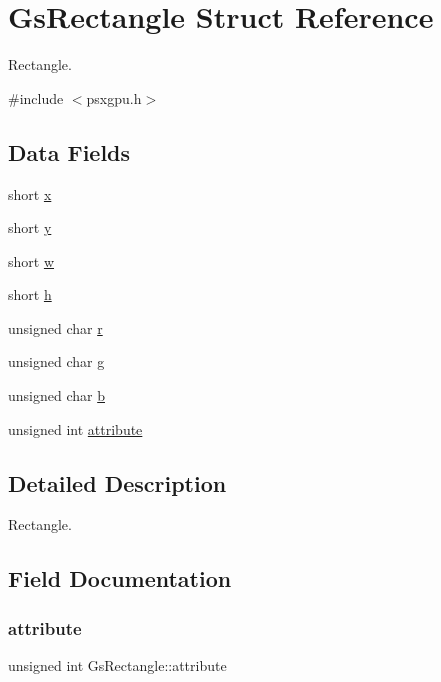 \hypertarget{structGsRectangle}{}\section{Gs\+Rectangle Struct Reference}
\label{structGsRectangle}


Rectangle.  




{\ttfamily \#include $<$psxgpu.\+h$>$}

\subsection*{Data Fields}
\begin{DoxyCompactItemize}
\item 
short \hyperlink{structGsRectangle_a8a8a192806843c780965015ed683d0a8}{x}
\item 
short \hyperlink{structGsRectangle_ae4ed9d3d091f0f0db713bd14eeacb760}{y}
\item 
short \hyperlink{structGsRectangle_a00989f6d3d57549b3606a584482e361d}{w}
\item 
short \hyperlink{structGsRectangle_ac45d6fdb150593eb8eefd22743095b52}{h}
\item 
unsigned char \hyperlink{structGsRectangle_ac86a6bb678cbcb69d9985f96e688b1e1}{r}
\item 
unsigned char \hyperlink{structGsRectangle_a734cac760af5b5878c433397ed7bd138}{g}
\item 
unsigned char \hyperlink{structGsRectangle_a9d865585075c4277ecbc75df08c095cb}{b}
\item 
unsigned int \hyperlink{structGsRectangle_a8133cbcc469e34ec75ab5ba4ba73c2de}{attribute}
\end{DoxyCompactItemize}


\subsection{Detailed Description}
Rectangle. 

\subsection{Field Documentation}
\mbox{\label{structGsRectangle_a8133cbcc469e34ec75ab5ba4ba73c2de}} 
\subsubsection{\texorpdfstring{attribute}{attribute}}
{\footnotesize\ttfamily unsigned int Gs\+Rectangle\+::attribute}

